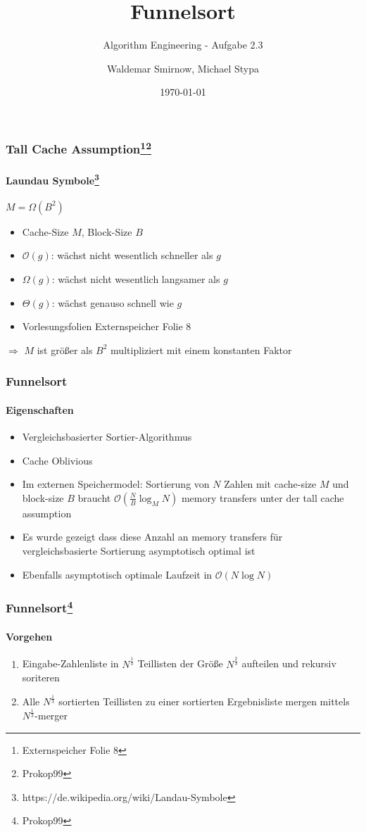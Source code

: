 \documentclass{beamer}
\title{Funnelsort}
\subtitle{Algorithm Engineering - Aufgabe 2.3}
\author{Waldemar Smirnow, Michael Stypa}
\institute{Universität Osnabrück}
\date{\today}
\begin{document}
\begin{frame}
  \titlepage
\end{frame}

\begin{frame}
  \frametitle{Tall Cache Assumption\footnote{Externspeicher Folie 8}\footnote{Prokop99}}
  \framesubtitle{Laundau Symbole\footnote{https://de.wikipedia.org/wiki/Landau-Symbole}}
  \begin{center}
    \Large
    $M = \Omega\left(B^2\right)$
  \end{center}
  \begin{itemize}
    \item Cache-Size $M$, Block-Size $B$
    \item $\mathcal{O}\left(g\right)$: wächst nicht wesentlich schneller als $g$
    \item $\Omega\left(g\right)$: wächst nicht wesentlich langsamer als $g$
    \item $\Theta\left(g\right)$: wächst genauso schnell wie $g$
    \item Vorlesungsfolien Externspeicher Folie 8
  \end{itemize}
  $\Rightarrow$ $M$ ist größer als $B^2$ multipliziert mit einem konstanten Faktor
\end{frame}

\begin{frame}
  \frametitle{Funnelsort}
  \framesubtitle{Eigenschaften}
  \begin{itemize}
    \item Vergleichsbasierter Sortier-Algorithmus
    \item Cache Oblivious
    \item Im externen Speichermodel: Sortierung von $N$ Zahlen
      mit cache-size $M$ und block-size $B$
      braucht $\mathcal{O}\left(\frac{N}{B}\log_M{N}\right)$ memory transfers
      unter der tall cache assumption
    \item Es wurde gezeigt dass diese Anzahl an memory transfers
      für vergleichsbasierte Sortierung asymptotisch optimal ist
    \item Ebenfalls asymptotisch optimale Laufzeit in $\mathcal{O}\left(N\log{N}\right)$
  \end{itemize}
\end{frame}

\begin{frame}
  \frametitle{Funnelsort\footnote{Prokop99}}
  \framesubtitle{Vorgehen}
  \begin{enumerate}
    \item Eingabe-Zahlenliste in $N^{\frac{1}{3}}$ Teillisten
      der Größe $N^{\frac{2}{3}}$ aufteilen und rekursiv soriteren
    \item Alle $N^{\frac{1}{3}}$ sortierten Teillisten zu einer
      sortierten Ergebnisliste mergen mittels $N^{\frac{1}{3}}$-merger
  \end{enumerate}
\end{frame}
\end{document}
